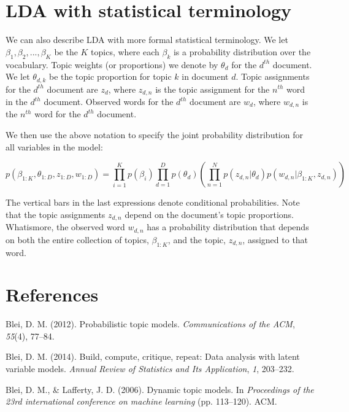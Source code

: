 \documentclass[12pt,]{article}
\begin{document}
\section{LDA with statistical
terminology}\label{lda-with-statistical-terminology}

We can also describe LDA with more formal statistical terminology. We
let \(\beta_1, \beta_2, ..., \beta_K\) be the \(K\) topics, where each
\(\beta_k\) is a probability distribution over the vocabulary. Topic
weights (or proportions) we denote by \(\theta_d\) for the \(d^{th}\)
document. We let \(\theta_{d,k}\) be the topic proportion for topic
\(k\) in document \(d\). Topic assignments for the \(d^{th}\) document
are \(z_d\), where \(z_{d,n}\) is the topic assignment for the
\(n^{th}\) word in the \(d^{th}\) document. Observed words for the
\(d^{th}\) document are \(w_d\), where \(w_{d, n}\) is the \(n^{th}\)
word for the \(d^{th}\) document.

We then use the above notation to specify the joint probability
distribution for all variables in the model:

\[p(\beta_{1:K}, \theta_{1:D}, z_{1:D}, w_{1:D}) = \prod_{i = 1}^Kp(\beta_i)\prod_{d = 1}^Dp(\theta_d)\left( \prod_{n = 1}^N p(z_{d,n}|\theta_d)p(w_{d,n}|\beta_{1:K}, z_{d,n})\right)\]

The vertical bars in the last expressions denote conditional
probabilities. Note that the topic assignments \(z_{d,n}\) depend on the
document's topic proportions. Whatismore, the observed word \(w_{d,n}\)
has a probability distribution that depends on both the entire
collection of topics, \(\beta_{1:K}\), and the topic, \(z_{d,n}\),
assigned to that word.

\section*{References}\label{references}

\hypertarget{refs}{}
\hypertarget{ref-blei2012probabilistic}{}
Blei, D. M. (2012). Probabilistic topic models. \emph{Communications of
the ACM}, \emph{55}(4), 77--84.

\hypertarget{ref-blei2014build}{}
Blei, D. M. (2014). Build, compute, critique, repeat: Data analysis with
latent variable models. \emph{Annual Review of Statistics and Its
Application}, \emph{1}, 203--232.

\hypertarget{ref-blei2006dynamic}{}
Blei, D. M., \& Lafferty, J. D. (2006). Dynamic topic models. In
\emph{Proceedings of the 23rd international conference on machine
learning} (pp. 113--120). ACM.
\end{document}
